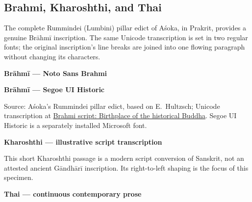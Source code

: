\documentclass[11pt,twoside]{impeart}
\begin{document}
\subsection{Brahmi, Kharoshthi, and Thai}

The complete Rummindei (Lumbini) pillar edict of Aśoka, in Prakrit,
provides a genuine Brāhmī inscription. The same Unicode transcription
is set in two regular fonts; the original inscription's line breaks
are joined into one flowing paragraph without changing its characters.

\noindent\textbf{Brāhmī --- Noto Sans Brahmi}\par\nobreak\smallskip
\noindent{}\par

\medskip
\noindent\textbf{Brāhmī --- Segoe UI Historic}\par\nobreak\smallskip
\noindent{}\par

\smallskip
{\footnotesize\noindent
Source: Aśoka's Rummindei pillar edict, based on E.~Hultzsch;
Unicode transcription at
\href{https://en.wikipedia.org/wiki/Brahmi_script}
{Brahmi script: Birthplace of the historical Buddha}.
Segoe UI Historic is a separately installed Microsoft font.\par}

\medskip
\noindent\textbf{Kharoshthi --- illustrative script transcription}\par\nobreak\smallskip
\begin{flushright}
\end{flushright}

\noindent
This short Kharoshthi passage is a modern script conversion of Sanskrit,
not an attested ancient Gāndhārī inscription. Its right-to-left shaping
is the focus of this specimen.

\medskip
\noindent\textbf{Thai --- continuous contemporary prose}\par\nobreak\smallskip
\noindent{}\par
\end{document}
